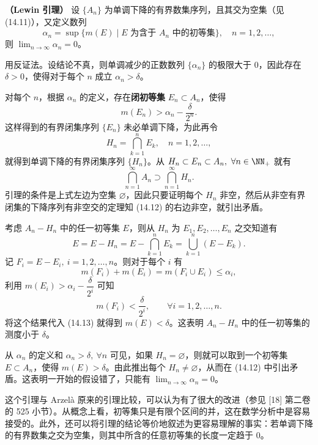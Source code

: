 \begin{xproposition}[14.2.5]
\textbf{（Lewin 引理）} 设 $\{A_n\}$ 为单调下降的有界数集序列，且其交为空集（见 (14.11)），又定义数列
\[
  \alpha_n=\sup\{m(E)\mid E\text{ 为含于 }A_n\text{ 中的初等集}\},\quad n=1,2,\ldots,
\]
则 $\displaystyle\lim_{n\to\infty}\alpha_n=0$。
\end{xproposition}
\begin{xproof}
用反证法。设结论不真，则单调减少的正数数列 $\{\alpha_n\}$ 的极限大于 $0$，因此存在 $\delta>0$，使得对于每个 $n$ 成立 $\alpha_n>\delta$。

对每个 $n$，根据 $\alpha_n$ 的定义，存在\textbf{闭初等集} $E_n\subset A_n$，使得
\[
  m(E_n)>\alpha_n-\frac{\delta}{2^n}.
\]
这样得到的有界闭集序列 $\{E_n\}$ 未必单调下降，为此再令
\[
  H_n=\bigcap_{k=1}^{n}E_k,\quad n=1,2,\ldots,
\]
就得到单调下降的有界闭集序列 $\{H_n\}$。从 $H_n\subset E_n\subset A_n,\ \forall n\in\NN_+$ 就有
\begin{equation}
  \bigcap_{n=1}^{\infty}A_n\supset\bigcap_{n=1}^{\infty}H_n.
  \tag{14.12}
  \label{eq:14.12}
\end{equation}
引理的条件是上式左边为空集 $\varnothing$，因此只要证明每个 $H_n$ 非空，然后从非空有界闭集的下降序列有非空交的定理知 (14.12) 的右边非空，就引出矛盾。

考虑 $A_n-H_n$ 中的任一初等集 $E$，则从 $H_n$ 为 $E_1,E_2,\ldots,E_n$ 之交知道有
\begin{equation}
  E=E-H_n=E-\bigcap_{k=1}^{n}E_k=\bigcup_{k=1}^{n}(E-E_k).
  \tag{14.13}
  \label{eq:14.13}
\end{equation}
记 $F_i=E-E_i,\ i=1,2,\ldots,n$。则对于每个 $i$ 有
\[
  m(F_i)+m(E_i)=m(F_i\cup E_i)\leqslant\alpha_i,
\]
利用 $m(E_i)>\alpha_i-\dfrac{\delta}{2^i}$ 可知
\[
  m(F_i)<\frac{\delta}{2^i},\qquad \forall i=1,2,\ldots,n.
\]
将这个结果代入 (14.13) 就得到 $m(E)<\delta$。这表明 $A_n-H_n$ 中的任一初等集的测度小于 $\delta$。

从 $\alpha_n$ 的定义和 $\alpha_n>\delta,\ \forall n$ 可见，如果 $H_n=\varnothing$，则就可以取到一个初等集 $E\subset A_n$，使得 $m(E)>\delta$。由此推出每个 $H_n\ne\varnothing$，从而在 (14.12) 中引出矛盾。这表明一开始的假设错了，只能有 $\displaystyle\lim_{n\to\infty}\alpha_n=0$。
\end{xproof}

\begin{xremark}
这个引理与 Arzelà 原来的引理比较，可以认为有了很大的改进（参见 [18] 第二卷的 525 小节）。从概念上看，初等集只是有限个区间的并，这在数学分析中是容易接受的。此外，还可以将引理的结论等价地叙述为更容易理解的事实：若单调下降的有界数集之交为空集，则其中所含的任意初等集的长度一定趋于 $0$。
\end{xremark}

